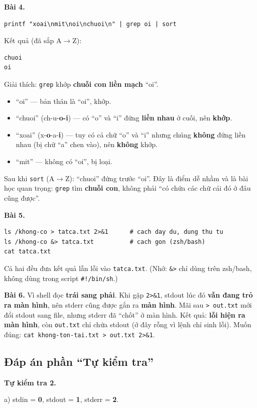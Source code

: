 \documentclass[12pt,a4paper]{article}
\newcommand{\cmd}[1]{\texttt{#1}}
\begin{document}
\textbf{Bài 4.}
\begin{Verbatim}
printf "xoai\nmit\noi\nchuoi\n" | grep oi | sort
\end{Verbatim}
Kết quả (đã sắp A$\rightarrow$Z):
\begin{Verbatim}
chuoi
oi
\end{Verbatim}
Giải thích: \cmd{grep} khớp \textbf{chuỗi con liền mạch} ``oi''.
\begin{itemize}[leftmargin=1.4em]
\item ``oi'' --- bản thân là ``oi'', khớp.
\item ``chuoi'' (ch-u-\textbf{o-i}) --- có ``o'' và ``i'' đứng \textbf{liền nhau} ở cuối, nên \textbf{khớp}.
\item ``xoai'' (x-\textbf{o}-a-\textbf{i}) --- tuy có cả chữ ``o'' và ``i'' nhưng chúng \textbf{không} đứng liền nhau (bị chữ ``a'' chen vào), nên \textbf{không} khớp.
\item ``mit'' --- không có ``oi'', bị loại.
\end{itemize}
Sau khi \cmd{sort} (A$\rightarrow$Z): ``chuoi'' đứng trước ``oi''. Đây là điểm dễ nhầm và là bài học quan trọng: \cmd{grep} tìm \textbf{chuỗi con}, không phải ``có chứa các chữ cái đó ở đâu cũng được''.

\textbf{Bài 5.}
\begin{Verbatim}
ls /khong-co > tatca.txt 2>&1      # cach day du, dung thu tu
ls /khong-co &> tatca.txt          # cach gon (zsh/bash)
cat tatca.txt
\end{Verbatim}
Cả hai đều đưa kết quả lẫn lỗi vào \cmd{tatca.txt}. (Nhớ: \cmd{\&>} chỉ dùng trên zsh/bash, không dùng trong script \cmd{\#!/bin/sh}.)

\textbf{Bài 6.}
Vì shell đọc \textbf{trái sang phải}. Khi gặp \cmd{2>\&1}, stdout lúc đó \textbf{vẫn đang trỏ ra màn hình}, nên stderr cũng được gắn ra \textbf{màn hình}. Mãi sau \cmd{> out.txt} mới đổi stdout sang file, nhưng stderr đã ``chốt'' ở màn hình. Kết quả: \textbf{lỗi hiện ra màn hình}, còn \cmd{out.txt} chỉ chứa stdout (ở đây rỗng vì lệnh chỉ sinh lỗi). Muốn đúng: \cmd{cat khong-ton-tai.txt > out.txt 2>\&1}.

\subsection{Đáp án phần ``Tự kiểm tra''}

\textbf{Tự kiểm tra 2.}

a) stdin = \textbf{0}, stdout = \textbf{1}, stderr = \textbf{2}.
\end{document}
